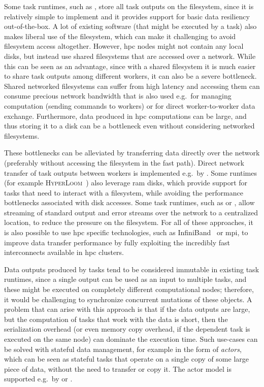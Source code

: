Some task runtimes, such as \snakemake{}, store all task outputs on the filesystem, since it is
relatively simple to implement and it provides support for basic data resiliency out-of-the-box.
A lot of existing software (that might be executed by a task) also makes liberal use of the filesystem,
which can make it challenging to avoid filesystem access altogether. However, \gls{hpc}
nodes might not contain any local disks, but instead use shared filesystems that are accessed
over a network. While this can be seen as an advantage, since with a shared filesystem it is much
easier to share task outputs among different workers, it can also be a severe bottleneck. Shared
networked filesystems can suffer from high latency and accessing them can consume precious network
bandwidth that is also used e.g.\ for managing computation (sending commands to workers) or for
direct worker-to-worker data exchange. Furthermore, data produced in \gls{hpc}
computations can be large, and thus storing it to a disk can be a bottleneck even without
considering networked filesystems.

These bottlenecks can be alleviated by transferring data directly over the
network (preferably without accessing the filesystem in the fast path). Direct network transfer of
task outputs between workers is implemented e.g.\ by \dask{}. Some runtimes (for example
\textsc{HyperLoom}~\cite{hyperloom}) also leverage \gls{ram} disks, which provide support for tasks
that need to interact with a filesystem, while avoiding the performance bottlenecks associated with disk
accesses. Some task runtimes, such as \hypershell{} or \pegasus{}, allow streaming of standard
output and error streams over the network to a centralized location, to reduce the pressure on
the filesystem. For all of these approaches, it is also possible to use \gls{hpc} specific technologies, such as
InfiniBand~\cite{infiniband} or \gls{mpi}, to improve data transfer
performance by fully exploiting the incredibly fast interconnects available in
\gls{hpc} clusters.

Data outputs produced by tasks tend to be considered immutable in existing task runtimes, since a
single output can be used as an input to multiple tasks, and these might be executed on completely
different computational nodes; therefore, it would be challenging to synchronize concurrent
mutations of these objects. A problem that can arise with this approach is that if the data outputs
are large, but the computation of tasks that work with the data is short, then the serialization
overhead (or even memory copy overhead, if the dependent task is executed on the same node) can
dominate the execution time. Such use-cases can be solved with stateful data management, for
example in the form of \emph{actors}, which can be seen as stateful tasks that
operate on a single copy of some large piece of data, without the need to transfer or copy it.
The actor model is supported e.g.\ by \dask{} or \ray{}.

